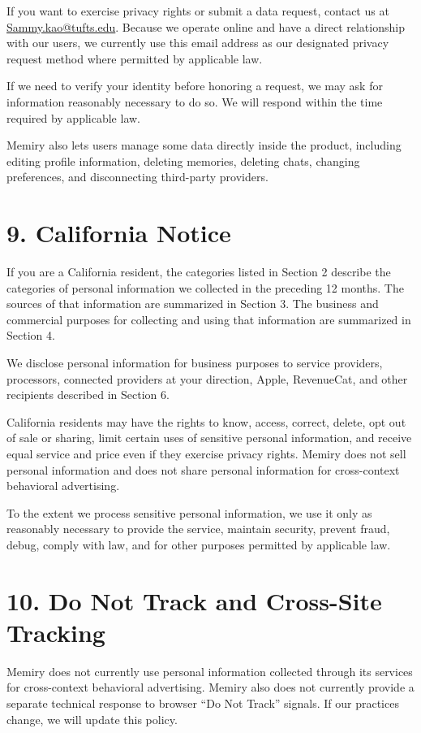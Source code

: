 \documentclass[11pt]{article}
\makeatletter
\newcommand{\PrivacyEmail}{\href{mailto:Sammy.kao@tufts.edu}{Sammy.kao@tufts.edu}}
\makeatother
\begin{document}
If you want to exercise privacy rights or submit a data request, contact us at \PrivacyEmail. Because we operate online and have a direct relationship with our users, we currently use this email address as our designated privacy request method where permitted by applicable law.

If we need to verify your identity before honoring a request, we may ask for information reasonably necessary to do so. We will respond within the time required by applicable law.

Memiry also lets users manage some data directly inside the product, including editing profile information, deleting memories, deleting chats, changing preferences, and disconnecting third-party providers.

\section*{9. California Notice}

If you are a California resident, the categories listed in Section 2 describe the categories of personal information we collected in the preceding 12 months. The sources of that information are summarized in Section 3. The business and commercial purposes for collecting and using that information are summarized in Section 4.

We disclose personal information for business purposes to service providers, processors, connected providers at your direction, Apple, RevenueCat, and other recipients described in Section 6.

California residents may have the rights to know, access, correct, delete, opt out of sale or sharing, limit certain uses of sensitive personal information, and receive equal service and price even if they exercise privacy rights. Memiry does not sell personal information and does not share personal information for cross-context behavioral advertising.

To the extent we process sensitive personal information, we use it only as reasonably necessary to provide the service, maintain security, prevent fraud, debug, comply with law, and for other purposes permitted by applicable law.

\section*{10. Do Not Track and Cross-Site Tracking}

Memiry does not currently use personal information collected through its services for cross-context behavioral advertising. Memiry also does not currently provide a separate technical response to browser ``Do Not Track'' signals. If our practices change, we will update this policy.
\end{document}
